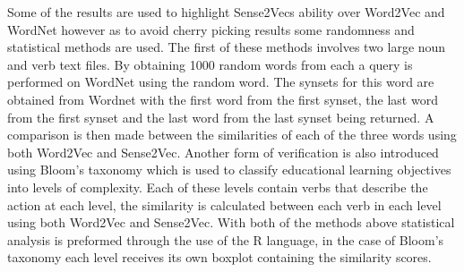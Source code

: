 Some of the results are used to highlight Sense2Vecs ability over Word2Vec and WordNet however as to avoid cherry picking results some randomness and statistical methods are used. The first of these methods involves two large noun and verb text files. By obtaining 1000 random words from each a query is performed on WordNet using the random word. The synsets for this word are obtained from Wordnet with the first word from the first synset, the last word from the first synset and the last word from the last synset being returned. A comparison is then made between the similarities of each of the three words using both Word2Vec and Sense2Vec. Another form of verification is also introduced using Bloom’s taxonomy which is used to classify educational learning objectives into levels of complexity. Each of these levels contain verbs that describe the action at each level, the similarity is calculated between each verb in each level using both Word2Vec and Sense2Vec. With both of the methods above statistical analysis is preformed through the use of the R language, in the case of Bloom’s taxonomy each level receives its own boxplot containing the similarity scores.